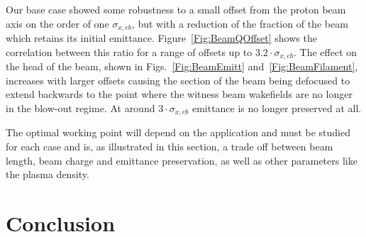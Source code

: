 \documentclass[aps,prstab,reprint,amsmath,amssymb,groupedaddress]{revtex4-1}
\newcommand{\unit}[1]{\,\mathrm{#1}}
\begin{document}
Our base case showed some robustness to a small offset from the proton beam axis on the order of one $\sigma_{x,eb}$,
but with a reduction of the fraction of the beam which retains its initial emittance. Figure~\ref{Fig:BeamQOffset} shows
the correlation between this ratio for a range of offsets up to $3.2\cdot\sigma_{x,eb}$. The effect on the head of the
beam, shown in Figs.~\ref{Fig:BeamEmitt} and~\ref{Fig:BeamFilament}, increases with larger offsets causing the section
of the beam being defocused to extend backwards to the point where the witness beam wakefields are no longer in the
blow-out regime. At around $3\cdot\sigma_{x,eb}$ emittance is no longer preserved at all.

The optimal working point will depend on the application and must be studied for each case and is, as illustrated in
this section, a trade off between beam length, beam charge and emittance preservation, as well as other parameters
like the plasma density.   

\section{Conclusion}\label{S:C}


\end{document}
